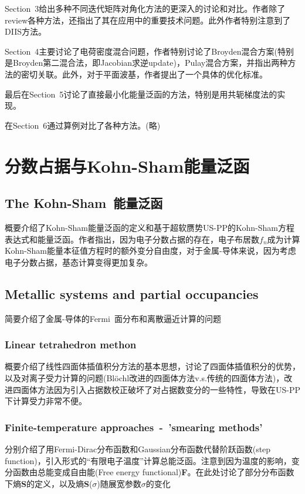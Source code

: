 \documentclass[14pt]{article}      %
\begin{document}
\textrm{Section~3}给出多种不同迭代矩阵对角化方法的更深入的讨论和对比。作者除了\textrm{review}各种方法，还指出了其在应用中的重要技术问题。此外作者特别注意到了\textrm{DIIS}方法。

\textrm{Section~4}主要讨论了电荷密度混合问题，作者特别讨论了\textrm{Broyden}混合方案(特别是\textrm{Broyden}第二混合法，即\textrm{Jacobian}求逆update)，\textrm{Pulay}混合方案，并指出两种方法的密切关联。此外，对于平面波基，作者提出了一个具体的优化标准。

最后在\textrm{Section~5}讨论了直接最小化能量泛函的方法，特别是用共轭梯度法的实现。

在\textrm{Section~6}通过算例对比了各种方法。(略)

\section{分数占据与Kohn-Sham能量泛函}
\subsection{The Kohn-Sham~能量泛函}
概要介绍了\textrm{Kohn-Sham}能量泛函的定义和基于超软赝势\textrm{US-PP}的\textrm{Kohn-Sham}方程表达式和能量泛函。作者指出，因为电子分数占据的存在，电子布居数$f_n$成为计算\textrm{Kohn-Sham}能量本征值方程时的额外变分自由度，对于金属-导体来说，因为考虑电子分数占据，基态计算变得更加复杂。
\subsection{Metallic systems and partial occupancies}
简要介绍了金属-导体的\textrm{Fermi~}面分布和离散逼近计算的问题
\subsubsection{Linear tetrahedron methon}
概要介绍了线性四面体插值积分方法的基本思想，讨论了四面体插值积分的优势，以及对离子受力计算的问题(\textrm{Bl\"ochl}改进的四面体方法\textrm{v.s.}传统的四面体方法)，改进四面体方法因为引入占据数校正破坏了对占据数变分的一些特性，导致在\textrm{US-PP}下计算受力非常不便。
\subsubsection{Finite-temperature approaches~-~'smearing methods'}
分别介绍了用\textrm{Fermi-Dirac}分布函数和\textrm{Gaussian}分布函数代替阶跃函数(\textrm{step function})，引入形式的“有限电子温度”计算总能泛函。注意到因为温度的影响，变分函数由总能变成自由能(\textrm{Free energy functional})\textbf{F}。在此处讨论了部分分布函数下熵\textbf{S}的定义，以及熵\textbf{S}($\sigma$)随展宽参数$\sigma$的变化
\end{document}
